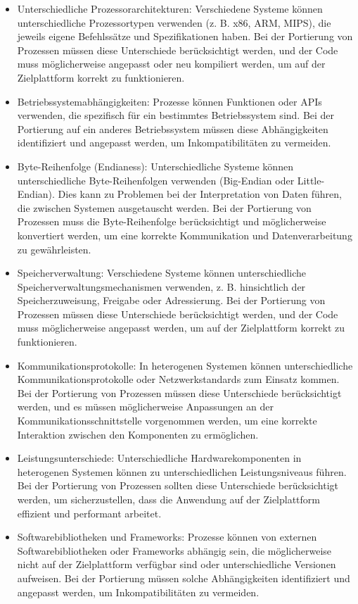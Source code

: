 \documentclass[../vs-script-first-v01.tex]{subfiles}
\begin{document}
\begin{itemize}
\item Unterschiedliche Prozessorarchitekturen: Verschiedene Systeme können unterschiedliche Prozessortypen verwenden (z. B. x86, ARM, MIPS), die jeweils eigene Befehlssätze und Spezifikationen haben. Bei der Portierung von Prozessen müssen diese Unterschiede berücksichtigt werden, und der Code muss möglicherweise angepasst oder neu kompiliert werden, um auf der Zielplattform korrekt zu funktionieren.
\item Betriebssystemabhängigkeiten: Prozesse können Funktionen oder APIs verwenden, die spezifisch für ein bestimmtes Betriebssystem sind. Bei der Portierung auf ein anderes Betriebssystem müssen diese Abhängigkeiten identifiziert und angepasst werden, um Inkompatibilitäten zu vermeiden.
\item Byte-Reihenfolge (Endianess): Unterschiedliche Systeme können unterschiedliche Byte-Reihenfolgen verwenden (Big-Endian oder Little-Endian). Dies kann zu Problemen bei der Interpretation von Daten führen, die zwischen Systemen ausgetauscht werden. Bei der Portierung von Prozessen muss die Byte-Reihenfolge berücksichtigt und möglicherweise konvertiert werden, um eine korrekte Kommunikation und Datenverarbeitung zu gewährleisten.
\item Speicherverwaltung: Verschiedene Systeme können unterschiedliche Speicherverwaltungsmechanismen verwenden, z. B. hinsichtlich der Speicherzuweisung, Freigabe oder Adressierung. Bei der Portierung von Prozessen müssen diese Unterschiede berücksichtigt werden, und der Code muss möglicherweise angepasst werden, um auf der Zielplattform korrekt zu funktionieren.
\item Kommunikationsprotokolle: In heterogenen Systemen können unterschiedliche Kommunikationsprotokolle oder Netzwerkstandards zum Einsatz kommen. Bei der Portierung von Prozessen müssen diese Unterschiede berücksichtigt werden, und es müssen möglicherweise Anpassungen an der Kommunikationsschnittstelle vorgenommen werden, um eine korrekte Interaktion zwischen den Komponenten zu ermöglichen.
\item Leistungsunterschiede: Unterschiedliche Hardwarekomponenten in heterogenen Systemen können zu unterschiedlichen Leistungsniveaus führen. Bei der Portierung von Prozessen sollten diese Unterschiede berücksichtigt werden, um sicherzustellen, dass die Anwendung auf der Zielplattform effizient und performant arbeitet.
\item Softwarebibliotheken und Frameworks: Prozesse können von externen Softwarebibliotheken oder Frameworks abhängig sein, die möglicherweise nicht auf der Zielplattform verfügbar sind oder unterschiedliche Versionen aufweisen. Bei der Portierung müssen solche Abhängigkeiten identifiziert und angepasst werden, um Inkompatibilitäten zu vermeiden.
\end{itemize}
\end{document}
